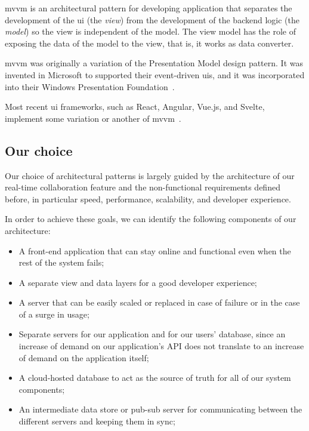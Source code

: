 \acrfull{mvvm} is an architectural pattern for developing application that separates the development of the \acrfull{ui} (the \emph{view}) from the development of the backend logic (the \emph{model}) so the view is independent of the model.
The view model has the role of exposing the data of the model to the view, that is, it works as data converter.

\acrshort{mvvm} was originally a variation of the Presentation Model design pattern. It was invented in Microsoft to supported their event-driven \acrshort{ui}s, and it was incorporated into their Windows Presentation Foundation~\autocite{smith_patterns_2009}.

Most recent \acrshort{ui} frameworks, such as React, Angular, Vue.js, and Svelte, implement some variation or another of \acrshort{mvvm}~\autocite{noauthor_javascript_nodate}.

\subsection{Our choice}

Our choice of architectural patterns is largely guided by the architecture of our real-time collaboration feature and the non-functional requirements defined before, in particular speed, performance, scalability, and developer experience.

In order to achieve these goals, we can identify the following components of our architecture:

\begin{itemize}
  \item A front-end application that can stay online and functional even when the rest of the system fails;
  \item A separate view and data layers for a good developer experience;
  \item A server that can be easily scaled or replaced in case of failure or in the case of a surge in usage;
  \item Separate servers for our application and for our users' database, since an increase of demand on our application's API does not translate to an increase of demand on the application itself;
  \item A cloud-hosted database to act as the source of truth for all of our system components;
  \item An intermediate data store or pub-sub server for communicating between the different servers and keeping them in sync;
\end{itemize}

